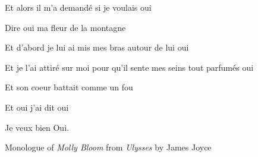 Et alors il m'a demand\'{e} si je voulais oui

Dire oui ma fleur de la montagne

Et d'abord je lui ai mis mes bras autour de lui oui

Et je l'ai attir\'{e} sur moi pour qu'il sente mes seins tout parfum\'{e}s oui

Et son coeur battait comme un fou

Et oui j'ai dit oui

Je veux bien Oui.

\begin{flushleft}
Monologue of \textit{Molly Bloom} from \textit{Ulysses} by James Joyce
\end{flushleft}

\endinput
